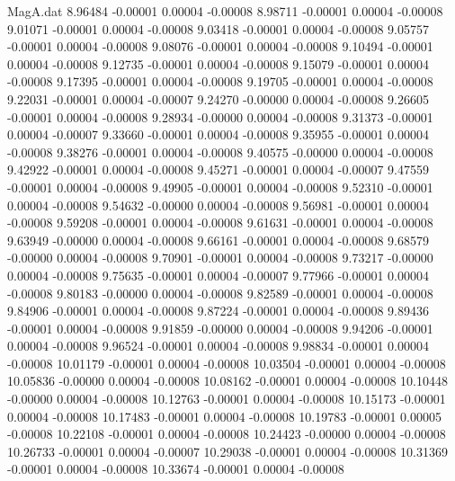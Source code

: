 \begin{filecontents}{MagA.dat}
   8.96484   -0.00001    0.00004   -0.00008
   8.98711   -0.00001    0.00004   -0.00008
   9.01071   -0.00001    0.00004   -0.00008
   9.03418   -0.00001    0.00004   -0.00008
   9.05757   -0.00001    0.00004   -0.00008
   9.08076   -0.00001    0.00004   -0.00008
   9.10494   -0.00001    0.00004   -0.00008
   9.12735   -0.00001    0.00004   -0.00008
   9.15079   -0.00001    0.00004   -0.00008
   9.17395   -0.00001    0.00004   -0.00008
   9.19705   -0.00001    0.00004   -0.00008
   9.22031   -0.00001    0.00004   -0.00007
   9.24270   -0.00000    0.00004   -0.00008
   9.26605   -0.00001    0.00004   -0.00008
   9.28934   -0.00000    0.00004   -0.00008
   9.31373   -0.00001    0.00004   -0.00007
   9.33660   -0.00001    0.00004   -0.00008
   9.35955   -0.00001    0.00004   -0.00008
   9.38276   -0.00001    0.00004   -0.00008
   9.40575   -0.00000    0.00004   -0.00008
   9.42922   -0.00001    0.00004   -0.00008
   9.45271   -0.00001    0.00004   -0.00007
   9.47559   -0.00001    0.00004   -0.00008
   9.49905   -0.00001    0.00004   -0.00008
   9.52310   -0.00001    0.00004   -0.00008
   9.54632   -0.00000    0.00004   -0.00008
   9.56981   -0.00001    0.00004   -0.00008
   9.59208   -0.00001    0.00004   -0.00008
   9.61631   -0.00001    0.00004   -0.00008
   9.63949   -0.00000    0.00004   -0.00008
   9.66161   -0.00001    0.00004   -0.00008
   9.68579   -0.00000    0.00004   -0.00008
   9.70901   -0.00001    0.00004   -0.00008
   9.73217   -0.00000    0.00004   -0.00008
   9.75635   -0.00001    0.00004   -0.00007
   9.77966   -0.00001    0.00004   -0.00008
   9.80183   -0.00000    0.00004   -0.00008
   9.82589   -0.00001    0.00004   -0.00008
   9.84906   -0.00001    0.00004   -0.00008
   9.87224   -0.00001    0.00004   -0.00008
   9.89436   -0.00001    0.00004   -0.00008
   9.91859   -0.00000    0.00004   -0.00008
   9.94206   -0.00001    0.00004   -0.00008
   9.96524   -0.00001    0.00004   -0.00008
   9.98834   -0.00001    0.00004   -0.00008
  10.01179   -0.00001    0.00004   -0.00008
  10.03504   -0.00001    0.00004   -0.00008
  10.05836   -0.00000    0.00004   -0.00008
  10.08162   -0.00001    0.00004   -0.00008
  10.10448   -0.00000    0.00004   -0.00008
  10.12763   -0.00001    0.00004   -0.00008
  10.15173   -0.00001    0.00004   -0.00008
  10.17483   -0.00001    0.00004   -0.00008
  10.19783   -0.00001    0.00005   -0.00008
  10.22108   -0.00001    0.00004   -0.00008
  10.24423   -0.00000    0.00004   -0.00008
  10.26733   -0.00001    0.00004   -0.00007
  10.29038   -0.00001    0.00004   -0.00008
  10.31369   -0.00001    0.00004   -0.00008
  10.33674   -0.00001    0.00004   -0.00008

\end{filecontents}
